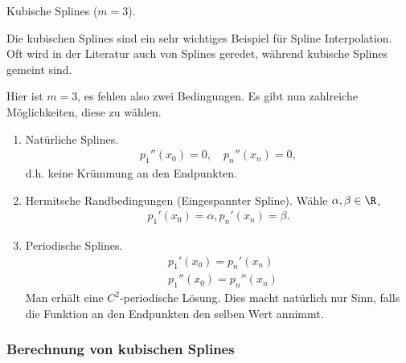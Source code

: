 \begin{bspn}
Kubische Splines ($m=3$).

Die kubischen Splines sind ein sehr wichtiges Beispiel für Spline
Interpolation. Oft wird in der Literatur auch von Splines geredet, während
kubische Splines gemeint sind.

Hier ist $m=3$, es fehlen also zwei Bedingungen. Es gibt nun zahlreiche
Möglichkeiten, diese zu wählen.
\begin{enumerate}[label=\arabic{*}.)]
  \item Natürliche Splines.
\begin{align*}
p_1''(x_0) = 0,\quad p_n''(x_n) = 0,\tag{R1}
\end{align*}
d.h. keine Krümmung an den Endpunkten.
\item Hermitsche Randbedingungen (Eingespannter Spline). Wähle
$\alpha,\beta\in\R$,
\begin{align*}
p_1'(x_0) = \alpha, p_n'(x_n) = \beta.\tag{R2}
\end{align*}
\item Periodische Splines.
\begin{align*}
&p_1'(x_0) = p_n'(x_n)\tag{R3}\\
&p_1''(x_0) = p_n''(x_n)
\end{align*}
Man erhält eine $C^2$-periodische Lösung. Dies macht natürlich nur Sinn, falls
die Funktion an den Endpunkten den selben Wert annimmt.
\end{enumerate}
\end{bspn}

\subsubsection{Berechnung von kubischen Splines}

